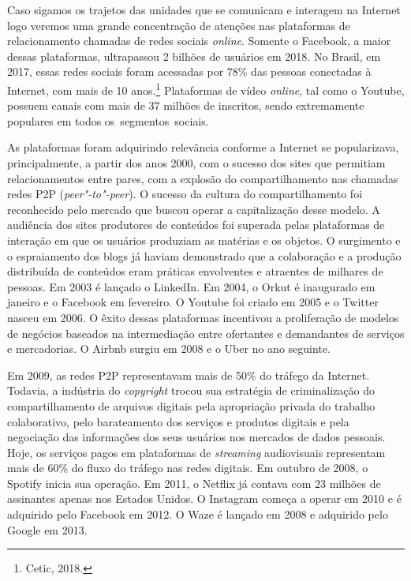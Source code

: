 Caso sigamos os trajetos das unidades que se comunicam e interagem na
Internet logo veremos uma grande concentração de atenções nas
plataformas de relacionamento chamadas de redes sociais \emph{online}. Somente
o Facebook, a maior dessas plataformas, ultrapassou 2 bilhões de
usuários em 2018. No Brasil, em 2017, essas redes sociais foram acessadas
por 78\% das pessoas conectadas à Internet, com mais de 10 anos.\footnote{Cetic,
2018.} Plataformas de vídeo \emph{online}, tal como o Youtube, possuem canais
com mais de 37 milhões de inscritos, sendo extremamente populares em
todos os~segmentos~sociais.

As plataformas foram adquirindo relevância conforme a Internet se
popularizava, principalmente, a partir dos anos 2000, com o sucesso dos
sites que permitiam relacionamentos entre pares, com a explosão do
compartilhamento nas chamadas redes P2P (\emph{peer"-to"-peer}). O sucesso da
cultura do compartilhamento foi reconhecido pelo mercado que buscou
operar a capitalização desse modelo. A audiência dos sites produtores de
conteúdos foi superada pelas plataformas de interação em que os usuários
produziam as matérias e os objetos. O surgimento e o espraiamento dos
blogs já haviam demonstrado que a colaboração e a produção distribuída
de conteúdos eram práticas envolventes e atraentes de milhares de
pessoas. Em 2003 é lançado o LinkedIn. Em 2004, o Orkut é inaugurado em
janeiro e o Facebook em fevereiro. O Youtube foi criado em 2005 e o
Twitter nasceu em 2006. O êxito dessas plataformas incentivou a
proliferação de modelos de negócios baseados na intermediação entre
ofertantes e demandantes de serviços e mercadorias. O Airbnb surgiu em
2008 e o Uber no ano seguinte.

Em 2009, as redes P2P representavam mais de 50\% do tráfego da Internet.
Todavia, a indústria do \emph{copyright} trocou sua estratégia de
criminalização do compartilhamento de arquivos digitais pela apropriação
privada do trabalho colaborativo, pelo barateamento dos serviços e
produtos digitais e pela negociação das informações dos seus usuários
nos mercados de dados pessoais. Hoje, os serviços pagos em plataformas
de \emph{streaming} audiovisuais representam mais de 60\% do fluxo do tráfego
nas redes digitais. Em outubro de 2008, o Spotify inicia sua operação.
Em 2011, o Netflix já contava com 23 milhões de assinantes apenas nos
Estados Unidos. O Instagram começa a operar em 2010 e é adquirido pelo
Facebook em 2012. O Waze é lançado em 2008 e adquirido pelo Google em
2013.

